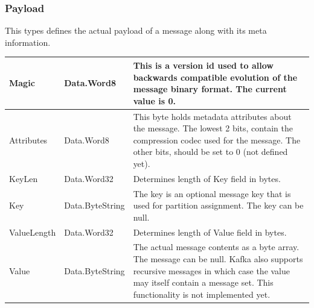 \subsubsection{Payload}
This types defines the actual payload of a message along with its meta
information.


\begin{table}[H]
\centering
\begin{tabular}{ l  l  p{8cm} }
\hline
Magic       & Data.Word8      & This is a version id used to allow backwards compatible evolution of the message binary format. The current value is 0.                                         \\ \hline
Attributes  & Data.Word8      & This byte holds metadata attributes about the
message. The lowest 2 bits, contain the compression codec used for the message.
The other bits, should be set to 0 (not defined yet). \\ \hline
KeyLen      & Data.Word32     & Determines length of Key field in bytes.                                                                                                                         \\ \hline
Key         & Data.ByteString & The key is an optional message key that is used for partition assignment. The key can be null.                                                                  \\ \hline
ValueLength & Data.Word32     & Determines length of Value field in bytes.                                                                                                                      \\ \hline
Value       & Data.ByteString & The actual message contents as a byte array. The message can be null. Kafka also supports recursive messages in which case 
                                the value may itself contain a message set. This
                                functionality is not implemented yet.                                                                                                                            \\ \hline
\end{tabular}
\end{table}

